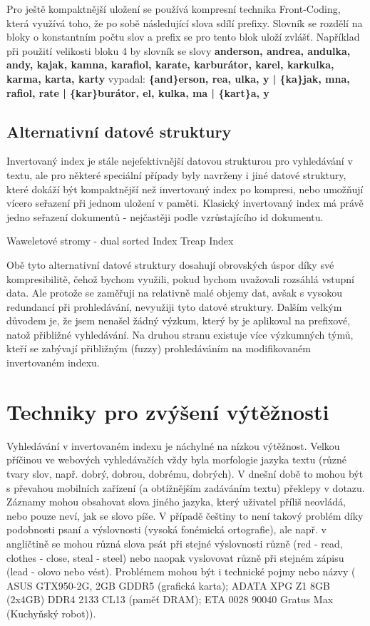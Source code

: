 \documentclass[11pt]{article}
\begin{document}
Pro ještě kompaktnější uložení se používá kompresní technika Front-Coding,
která využívá toho, že po sobě následující slova sdílí prefixy. Slovník se
rozdělí na bloky o konstantním počtu slov a prefix se pro tento blok uloží
zvlášť. Například při použití velikosti bloku 4 by slovník se slovy
\textbf{anderson, andrea, andulka, andy, kajak, kamna, karafiol, karate,
karburátor, karel, karkulka, karma, karta, karty} vypadal:
\textbf{\{and\}erson, rea, ulka, y | \{ka\}jak, mna, rafiol, rate | \{kar\}burátor, el, kulka, ma | \{kart\}a, y}


\subsection{Alternativní datové struktury}
Invertovaný index je stále nejefektivnější datovou strukturou pro vyhledávání v
textu, ale pro některé speciální případy byly navrženy i jiné datové struktury,
které dokáží být kompaktnější než invertovaný index po kompresi, nebo umožňují
vícero seřazení při jednom uložení v paměti. Klasický invertovaný index má
právě jedno seřazení dokumentů - nejčastěji podle vzrůstajícího id dokumentu.

Waweletové stromy - dual sorted Index Treap Index

Obě tyto alternativní datové struktury dosahují obrovských úspor díky
své kompresibilitě, čehož bychom využili, pokud bychom uvažovali
rozsáhlá vstupní data. Ale protože se zaměřuji na relativně malé objemy
dat, avšak s vysokou redundancí při prohledávání, nevyužiji tyto datové
struktury. Dalším velkým důvodem je, že jsem nenašel žádný výzkum, který
by je aplikoval na prefixové, natož přibližné vyhledávání. Na druhou
stranu existuje více výzkumných týmů, kteří se zabývají přibližným
(fuzzy) prohledáváním na modifikovaném invertovaném indexu.

\section{Techniky pro zvýšení výtěžnosti}
Vyhledávání v invertovaném indexu je náchylné na nízkou výtěžnost. Velkou
příčinou ve webových vyhledávačích vždy byla morfologie jazyka textu (různé
tvary slov, např. dobrý, dobrou, dobrému, dobrých). V dnešní době to mohou být
s převahou mobilních zařízení (a obtížnějším zadáváním textu) překlepy v
dotazu. Záznamy mohou obsahovat slova jiného jazyka, který uživatel příliš
neovládá, nebo pouze neví, jak se slovo píše. V případě češtiny to není takový
problém díky podobnosti psaní a výslovnosti (vysoká fonémická ortografie), ale
např. v angličtině se mohou různá slova psát při stejné výslovnosti různě (red
- read, clothes - close, steal - steel) nebo naopak vyslovovat různě při
stejném zápisu (lead - olovo nebo vést). Problémem mohou být i technické pojmy
nebo názvy ( ASUS GTX950-2G, 2GB GDDR5 (grafická karta); ADATA XPG Z1 8GB
(2x4GB) DDR4 2133 CL13 (paměť DRAM); ETA 0028 90040 Gratus Max (Kuchyňský
robot)).
\end{document}
